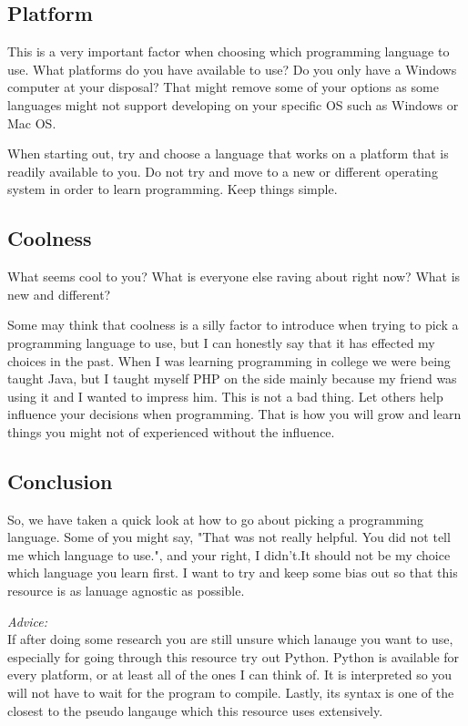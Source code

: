 \subsection{Platform}
This is a very important factor when choosing which programming language to use.
What platforms do you have available to use?
Do you only have a Windows computer at your disposal?
That might remove some of your options as some languages might not support developing on your specific OS such as Windows or Mac OS.
\par

When starting out, try and choose a language that works on a platform that is readily available to you.
Do not try and move to a new or different operating system in order to learn programming.
Keep things simple.

\subsection{Coolness}
What seems cool to you?
What is everyone else raving about right now?
What is new and different?
\par

Some may think that coolness is a silly factor to introduce when trying to pick a programming language to use, but I can honestly
say that it has effected my choices in the past.
When I was learning programming in college we were being taught Java, but I taught myself PHP on the side
mainly because my friend was using it and I wanted to impress him.
This is not a bad thing.
Let others help influence your decisions when programming. That is how you will grow and learn things you might not of
experienced without the influence.


\subsection{Conclusion}
So, we have taken a quick look at how to go about picking a programming language.
Some of you might say, "That was not really helpful. You did not tell me which language to use.", and your right, I didn't.It should not be my choice which language you learn first.
I want to try and keep some bias out so that this resource is as lanuage agnostic as possible.
\par 

\emph{Advice:}
\\
If after doing some research you are still unsure which lanauge you want to use, especially for going through this resource try out Python.
Python is available for every platform, or at least all of the ones I can think of. It is interpreted so you will not
have to wait for the program to compile. Lastly, its syntax is one of the closest to the pseudo langauge which this resource
uses extensively.
